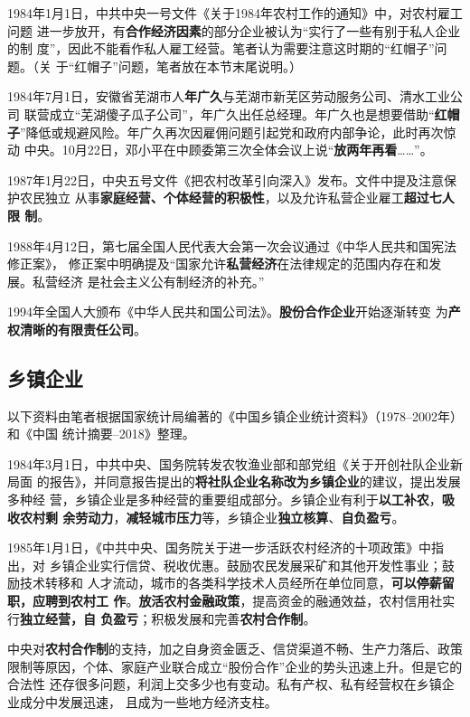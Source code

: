 1984年1月1日，中共中央一号文件《关于1984年农村工作的通知》中，对农村雇工问题
进一步放开，有\textbf{合作经济因素}的部分企业被认为“实行了一些有别于私人企业的制
度”，因此不能看作私人雇工经营。笔者认为需要注意这时期的“红帽子”问题。（关
于“红帽子”问题，笔者放在本节末尾说明。）

1984年7月1日，安徽省芜湖市人\textbf{年广久}与芜湖市新芜区劳动服务公司、清水工业公司
联营成立“芜湖傻子瓜子公司”，年广久出任总经理。年广久也是想要借助“\textbf{红帽
  子}”降低或规避风险。年广久再次因雇佣问题引起党和政府内部争论，此时再次惊动
中央。10月22日，邓小平在中顾委第三次全体会议上说“\textbf{放两年再看}……”。

1987年1月22日，中央五号文件《把农村改革引向深入》发布。文件中提及注意保护农民独立
从事\textbf{家庭经营、个体经营的积极性}，以及允许私营企业雇工\textbf{超过七人限
  制}。

1988年4月12日，第七届全国人民代表大会第一次会议通过《中华人民共和国宪法修正案》，
修正案中明确提及“国家允许\textbf{私营经济}在法律规定的范围内存在和发展。私营经济
是社会主义公有制经济的补充。”

1994年全国人大颁布《中华人民共和国公司法》。\textbf{股份合作企业}开始逐渐转变
为\textbf{产权清晰的有限责任公司}。

\subsection{乡镇企业}

以下资料由笔者根据国家统计局编著的《中国乡镇企业统计资料》（1978--2002年）和《中国
统计摘要--2018》整理。



1984年3月1日，中共中央、国务院转发农牧渔业部和部党组《关于开创社队企业新局面
的报告》，并同意报告提出的\textbf{将社队企业名称改为乡镇企业}的建议，提出发展多种经
营，乡镇企业是多种经营的重要组成部分。乡镇企业有利于\textbf{以工补农}，\textbf{吸收农村剩
  余劳动力}，\textbf{减轻城市压力}等，乡镇企业\textbf{独立核算}、\textbf{自负盈亏}。

1985年1月1日，《中共中央、国务院关于进一步活跃农村经济的十项政策》中指出，对
乡镇企业实行信贷、税收优惠。鼓励农民发展采矿和其他开发性事业；鼓励技术转移和
人才流动，城市的各类科学技术人员经所在单位同意，\textbf{可以停薪留职，应聘到农村工
  作}。\textbf{放活农村金融政策}，提高资金的融通效益，农村信用社实行\textbf{独立经营，自
  负盈亏}；积极发展和完善\textbf{农村合作制}。

中央对\textbf{农村合作制}的支持，加之自身资金匮乏、信贷渠道不畅、生产力落后、政策
限制等原因，个体、家庭产业联合成立“股份合作”企业的势头迅速上升。但是它的合法性
还存很多问题，利润上交多少也有变动。私有产权、私有经营权在乡镇企业成分中发展迅速，
且成为一些地方经济支柱。

